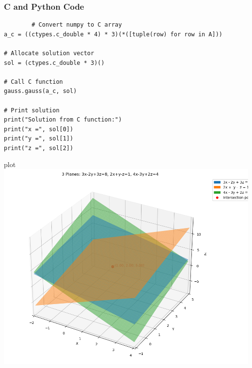 \documentclass{beamer}
\begin{document}
\begin{frame}[fragile]
    \frametitle{C and Python Code}
    \begin{lstlisting}
        # Convert numpy to C array
a_c = ((ctypes.c_double * 4) * 3)(*([tuple(row) for row in A]))

# Allocate solution vector
sol = (ctypes.c_double * 3)()

# Call C function
gauss.gauss(a_c, sol)

# Print solution
print("Solution from C function:")
print("x =", sol[0])
print("y =", sol[1])
print("z =", sol[2])
    \end{lstlisting}
\end{frame}
\begin{frame}{plot}
     \centering
    \includegraphics[width=\columnwidth, height=0.8\textheight, keepaspectratio]{Figure_10.png} 
\end{frame}
\end{document}
